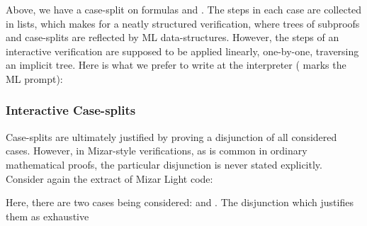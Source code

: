 Above, we have a case-split on formulas  and . The steps in each case are collected in lists, which makes for a neatly structured verification, where trees of subproofs and case-splits are reflected by ML data-structures. However, the steps of an interactive verification are supposed to be applied linearly, one-by-one, traversing an implicit tree. Here is what we prefer to write at the interpreter (\code{>} marks the ML prompt):

\vspace{0.5cm}
\begin{minipage}{\linewidth}
  \footnotesize







\end{minipage}
\vspace{0.5cm}

\subsubsection{Interactive Case-splits}
Case-splits are ultimately justified by proving a disjunction of all considered cases. However, in Mizar-style verifications, as is common in ordinary mathematical proofs, the particular disjunction is never stated explicitly. Consider again the extract of Mizar Light code:

\vspace{0.5cm}
\begin{minipage}{\linewidth}
  \footnotesize

  \code{\quad\enspace[[suppose "p1 = p2";}

  \code{\qquad\enspace qed from [0] by [LEMMA1]];}

  \code{\qquad [suppose "$\neg$(p1 = p2)";}

  \code{\qquad\enspace qed from [1]]]];}
\end{minipage}
\vspace{0.5cm}

{\samepage Here, there are two cases being considered:  and . The disjunction which justifies them as exhaustive
\begin{center}\end{center}}

